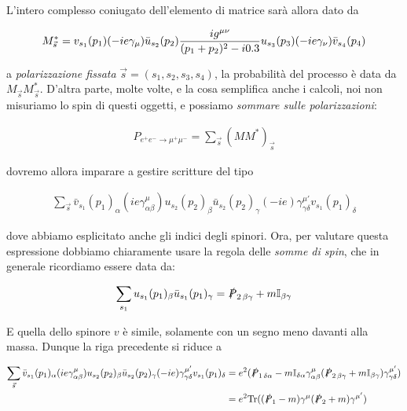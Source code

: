 \documentclass[11pt]{report}
\begin{document}

L'intero complesso coniugato dell'elemento di matrice sarà allora dato da 

\begin{align}
    M^*_{\vec{s}} = v_{s_1}(p_1)(-ie\gamma_\mu)\bar{u}_{s_2}(p_2)\frac{ig^{\mu\nu}}{(p_1 + p_2)^2 -i0.3}u_{s_3}(p_3)(-ie\gamma_\nu)\bar{v}_{s_4}(p_4)
\end{align}

a \emph{polarizzazione fissata} \(\vec{s} = (s_1, s_2, s_3, s_4)\), la probabilità del processo è data da \(M_{\vec{s}}M^*_{\vec{s}}\). D'altra parte, molte volte, e la cosa semplifica anche i calcoli, noi non misuriamo lo spin di questi oggetti, e possiamo \emph{sommare sulle polarizzazioni}: 

\begin{align}
    P_{e^+e^- \rightarrow \mu^+\mu^-} = \sum_{\vec{s}}(MM^*)_{\vec{s}}
\end{align}

dovremo allora imparare a gestire scritture del tipo 

\begin{align}
    \sum_{\vec{s}} \bar{v}_{s_1}(p_1)_{\alpha}(ie\gamma^\mu_{\alpha\beta})u_{s_2}(p_2)_\beta\bar{u}_{s_2}(p_2)_\gamma (-ie)\gamma^{\mu'}_{\gamma\delta}v_{s_1}(p_1)_\delta
\end{align}

dove abbiamo esplicitato anche gli indici degli spinori. Ora, per valutare questa espressione dobbiamo chiaramente usare la regola delle \emph{somme di spin}, che in generale ricordiamo essere data da:

\begin{align}
    \sum_{s_1}u_{s_1}(p_1)_\beta\bar{u}_{s_1}(p_1)_\gamma = \slashed{P}_{2\, \beta\gamma} + m\mathbb{I}_{\beta\gamma}
\end{align}

E quella dello spinore \(v\) è simile, solamente con un segno meno davanti alla massa. Dunque la riga precedente si riduce a 

\begin{align}
    \sum_{\vec{s}} \bar{v}_{s_1}(p_1)_{\alpha}(ie\gamma^\mu_{\alpha\beta})u_{s_2}(p_2)_\beta\bar{u}_{s_2}(p_2)_\gamma (-ie)\gamma^{\mu'}_{\gamma\delta}v_{s_1}(p_1)_\delta &= e^2 (\slashed{P}_{1\, \delta\alpha} - m\mathbb{I}_{\delta\alpha}\gamma^\mu_{\alpha\beta}(\slashed{P}_{2\, \beta\gamma}+m\mathbb{I}_{\beta\gamma})\gamma^{\mu'}_{\gamma\delta}) \\
    &= e^2\text{Tr}((\slashed{P}_1 - m)\gamma^{\mu}(\slashed{P}_2 +m)\gamma^{\mu'})
\end{align}
\end{document}
